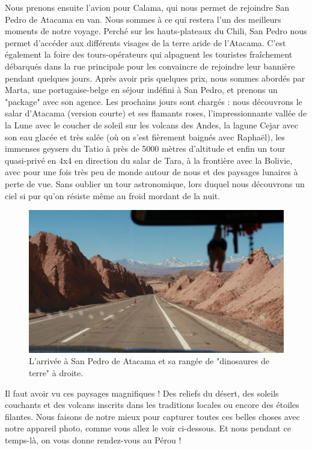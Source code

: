 Nous prenons ensuite l'avion pour Calama, qui nous permet de rejoindre
San Pedro de Atacama en van. Nous sommes à ce qui restera l'un des
meilleurs moments de notre voyage. Perché sur les hauts-plateaux du
Chili, San Pedro nous permet d'accéder aux différents visages de la
terre aride de l'Atacama. C'est également la foire des tours-opérateurs
qui alpaguent les touristes fraîchement débarqués dans la rue principale
pour les convaincre de rejoindre leur bannière pendant quelques jours.
Après avoir pris quelques prix, nous sommes abordés par Marta, une
portugaise-belge en séjour indéfini à San Pedro, et prenons un "package"
avec son agence. Les prochains jours sont chargés : nous découvrons le
salar d'Atacama (version courte) et ses flamants roses,
l'impressionnante vallée de la Lune avec le coucher de soleil sur les
volcans des Andes, la lagune Cejar avec son eau glacée et très salée (où
on s'est fièrement baignés avec Raphaël), les immenses geysers du Tatio
à près de 5000 mètres d'altitude et enfin un tour quasi-privé en 4x4 en
direction du salar de Tara, à la frontière avec la Bolivie, avec pour
une fois très peu de monde autour de nous et des paysages lunaires à
perte de vue. Sans oublier un tour astronomique, lors duquel nous
découvrons un ciel si pur qu'on résiste même au froid mordant de la
nuit.

\begin{figure}
\centering
\includegraphics{images/20180904_sanpedro.JPG}
\caption{L'arrivée à San Pedro de Atacama et sa rangée de "dinosaures de
terre" à droite.}
\end{figure}

Il faut avoir vu ces paysages magnifiques ! Des reliefs du désert, des
soleils couchants et des volcans inscrits dans les traditions locales ou
encore des étoiles filantes. Nous faisons de notre mieux pour capturer
toutes ces belles choses avec notre appareil photo, comme vous allez le
voir ci-dessous. Et nous pendant ce temps-là, on vous donne rendez-vous
au Pérou !

